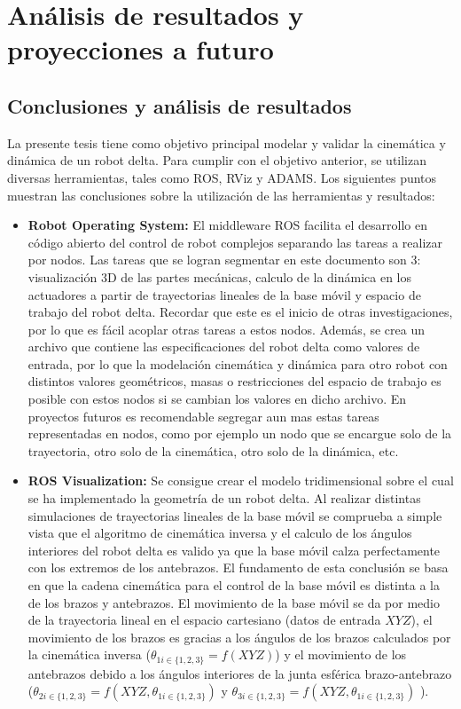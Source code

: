 \chapter{Análisis de resultados y proyecciones a futuro}\label{CAP8}

\section{Conclusiones y análisis de resultados}
        La presente tesis tiene como objetivo principal modelar y validar la cinemática y dinámica de un robot delta. Para cumplir con el objetivo anterior, se utilizan diversas herramientas, tales como ROS, RViz y ADAMS. Los siguientes puntos muestran las conclusiones sobre la utilización de las herramientas y resultados:
        
        \begin{itemize}
            \item {\textbf{Robot Operating System:} El middleware ROS facilita el desarrollo en código abierto del control de robot complejos separando las tareas a realizar por nodos. Las tareas que se logran segmentar en este documento son 3: visualización 3D de las partes mecánicas, calculo de la dinámica en los actuadores a partir de trayectorias lineales de la base móvil  y espacio de trabajo del robot delta. Recordar que este es el inicio de otras investigaciones, por lo que es fácil acoplar otras tareas a estos nodos. Además, se crea un archivo que contiene las especificaciones del robot delta como valores de entrada, por lo que la modelación cinemática y dinámica para otro robot con distintos valores geométricos, masas o restricciones del espacio de trabajo es posible con estos nodos si se cambian los valores en dicho archivo. En proyectos futuros es recomendable segregar aun mas estas tareas representadas en nodos, como por ejemplo un nodo que se encargue solo de la trayectoria, otro solo de la cinemática, otro solo de la dinámica, etc.  }
            \item {\textbf{ROS Visualization:} Se consigue crear el modelo tridimensional sobre el cual se ha implementado la geometría de un robot delta. Al realizar distintas simulaciones de trayectorias lineales de la base móvil se comprueba a simple vista que el algoritmo de cinemática inversa y el calculo de los ángulos interiores del robot delta es valido ya que la base móvil calza perfectamente con los extremos de los antebrazos. El fundamento de esta conclusión se basa en que la cadena cinemática para el control de la base móvil es distinta a la de los brazos y antebrazos. El movimiento de la base móvil se da por medio de la trayectoria lineal en el espacio cartesiano (datos de entrada $XYZ$), el movimiento de los brazos es gracias a los ángulos de los brazos calculados por la cinemática inversa ($\theta_{1i\in \{1,2,3\}} =f(XYZ)$) y el movimiento de los antebrazos debido a los ángulos interiores de la junta esférica brazo-antebrazo ($\theta_{2i\in \{1,2,3\}} =f(XYZ,\theta_{1i\in \{1,2,3\}} ) $ y $\theta_{3i\in \{1,2,3\}} =f(XYZ,\theta_{1i\in \{1,2,3\}} ) $ ).}

\end{itemize}
